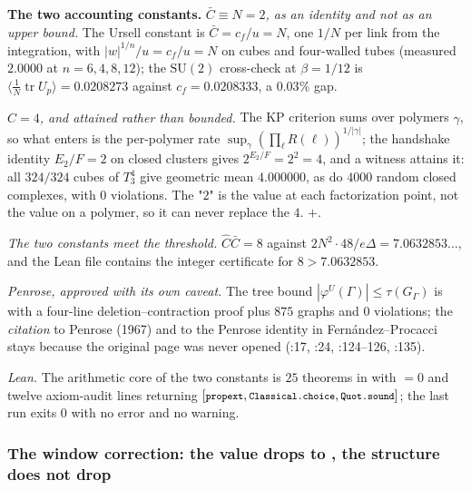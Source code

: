 \noindent\textbf{The two accounting constants.} \emph{$\bar C\equiv N=2$, as an identity and not as
an upper bound.} The Ursell constant is $\bar C=c_f/u=N$, one $1/N$ per link from the integration,
with $|w|^{1/n}/u=c_f/u=N$ on cubes and four-walled tubes (measured $2.0000$ at $n=6,4,8,12$); the
$\mathrm{SU}(2)$ cross-check at $\beta=1/12$ is $\langle\tfrac1N\operatorname{tr}U_p\rangle
=0.0208273$ against $c_f=0.0208333$, a $0.03\%$ gap.

\smallskip
\noindent\emph{$\hat C=4$, and attained rather than bounded.} The KP criterion sums over polymers
$\gamma$, so what enters is the per-polymer rate $\sup_\gamma(\prod_\ell R(\ell))^{1/|\gamma|}$; the
handshake identity $E_2/F=2$ on closed clusters gives $2^{E_2/F}=2^2=4$, and a witness attains it:
all $324/324$ cubes of $T^4_3$ give geometric mean $4.000000$, as do $4000$ random closed
complexes, with $0$ violations. The "$2$" is the value at each factorization point, not the value on
a polymer, so it can never replace the $4$. \LT{}$+$\LE.

\smallskip
\noindent\emph{The two constants meet the threshold.} $\hat C\bar C=8$ against
$2N^2\cdot48/e\Delta=7.0632853\ldots$, and the Lean file contains the integer certificate for
$8>7.0632853$. 

\smallskip
\noindent\emph{Penrose, approved with its own caveat.} The tree bound $|\varphi^U(\Gamma)|\le
\tau(G_\Gamma)$ is \LT{} with a four-line deletion--contraction proof plus $875$ graphs and $0$
violations; the \emph{citation} to Penrose (1967) and to the Penrose identity in
Fern\'andez--Procacci stays \LC{} because the original page was never opened
(:17, :24, :124--126, :135).

\smallskip
\noindent\emph{Lean.} The arithmetic core of the two constants is $25$ theorems in
 with  $=0$ and twelve axiom-audit lines returning
$[\code{propext},\code{Classical.choice},\code{Quot.sound}]$; the last run exits $0$ with no error
and no warning. 

\subsubsection{The window correction: the value drops to \texorpdfstring{\LC}{[C]}, the structure does not drop}
\label{sec:est-window-fix}

